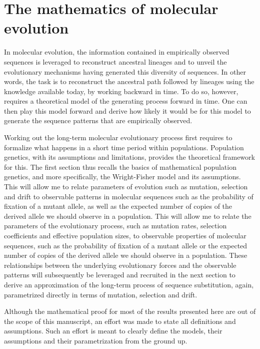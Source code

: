 \thispagestyle{empty}
\chapter{The mathematics of molecular evolution}
{\hypersetup{linkcolor=GREYDARK}\minitoc}
\label{chap:intro-formalism}

In molecular evolution, the information contained in empirically observed sequences is leveraged to reconstruct ancestral lineages and to unveil the evolutionary mechanisms having generated this diversity of sequences.
In other words, the task is to reconstruct the ancestral path followed by lineages using the knowledge available today, by working backward in time.
To do so, however, requires a theoretical model of the generating process forward in time.
One can then play this model forward and derive how likely it would be for this model to generate the sequence patterns that are empirically observed.

Working out the long-term molecular evolutionary process first requires to formalize what happens in a short time period within populations.
Population genetics, with its assumptions and limitations, provides the theoretical framework for this.
The first section thus recalls the basics of mathematical population genetics, and more specifically, the Wright-Fisher model and its assumptions.
This will allow me to relate parameters of evolution such as mutation, selection and drift to observable patterns in molecular sequences such as the probability of fixation of a mutant \gls{allele}, as well as the expected number of copies of the derived \gls{allele} we should observe in a population.
This will allow me to relate the parameters of the evolutionary process, such as mutation rates, selection coefficients and effective population sizes, to observable properties of molecular sequences, such as the probability of fixation of a mutant allele or the expected number of copies of the derived allele we should observe in a population.
These relationships between the underlying evolutionary forces and the observable patterns will subsequently be leveraged and recruited in the next section to derive an approximation of the long-term process of sequence substitution, again, parametrized directly in terms of mutation, selection and drift.

Although the mathematical proof for most of the results presented here are out of the scope of this manuscript, an effort was made to state all definitions and assumptions.
Such an effort is meant to clearly define the models, their assumptions and their parametrization from the ground up.


